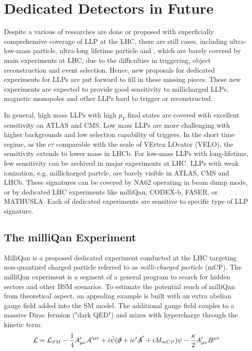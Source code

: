 \section{Dedicated Detectors in Future}

Despite a various of researches are done or proposed with superficially comprehensive coverage of LLP at the LHC, there are still cases, including ultra-low-mass particle, ultra-long lifetime particle and , which are barely covered by main experiments at LHC, due to the difficulties in triggering, object reconstruction and event selection. Hence, new proposals for dedicated experiments for LLPs are put forward to fill in these missing pieces. These new experiments are expected to provide good sensitivity to millicharged LLPs, magnetic monopoles and other LLPs hard to trigger or reconstructed.

In general, high mass LLPs with high $p_T$ final states are covered with excellent sensitivity on ATLAS and CMS. Low mass LLPs are more challenging with higher backgrounds and low selection capability of triggers. In the short time regime, as the $c\tau$ comparable with the scale of VErtex LOcator (VELO), the sensitivity extends to lower mass in LHCb. For low-mass LLPs with long-lifetime, few sensitivity can be archived in majar experiments at LHC. LLPs with weak ionization, e.g. millicharged partcle, are barely visible in ATLAS, CMS and LHCb. These signatures can be covered by NA62 operating in beam dump mode, or by dedicated LHC experiments like milliQan, CODEX-b, FASER, or MATHUSLA. Each of dedicated experiments are sensitive to specific type of LLP signature.

\subsection{The milliQan Experiment}

MilliQan is a proposed dedicated experiment conducted at the LHC targeting non-quantized charged particle referred to as \textit{milli-charged particle} (mCP). The milliQan experiment is a segment of a general program to search for hidden sectors and other BSM scenarios. To estimate the potential reach of milliQan from theoretical aspect, an appealing example is built with an extra abelian gauge field added into the SM model. The additional gauge field couples to a massive Dirac fermion ("dark QED") and mixes with hypercharge through the kinetic term:
\begin{equation}
\mathcal{L} = \mathcal{L}_{SM}-\frac{1}{4}A_{\mu\nu}^{\prime}A^{\prime\mu\nu}+i\bar{\psi}(\slashed{\partial}+ie^{\prime}\slashed{A}^{\prime}+ iM_{mCP})\psi-\frac{\kappa}{2}A^{\prime}_{\mu\nu}B^{\mu\nu}
\end{equation}

